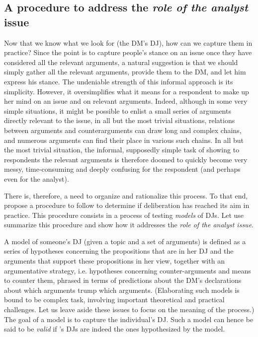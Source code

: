 \documentclass[version=3.21, pagesize, twoside=off, bibliography=totoc, DIV=calc, fontsize=12pt, a4paper, french, english]{scrartcl}
\begin{document}
\subsection{A procedure to address the \emph{role of the analyst} issue}
Now that we know what we look for (the \ac{DM}'s \ac{DJ}), how can we capture them in practice? Since the point is to capture people’s stance on an issue once they have considered all the relevant arguments, a natural suggestion is that we should simply gather all the relevant arguments, provide them to the \ac{DM}, and let him express his stance. The undeniable strength of this informal approach is its simplicity. However, it oversimplifies what it means for a respondent to make up her mind on an issue and on relevant arguments. Indeed, although in some very simple situations, it might be possible to enlist a small series of arguments directly relevant to the issue, in all but the most trivial situations, relations between arguments and counterarguments can draw long and complex chains, and numerous arguments can find their place in various such chains. In all but the most trivial situation, the informal, supposedly simple task of showing to respondents the relevant arguments is therefore doomed to quickly become very messy, time-consuming and deeply confusing for the respondent (and perhaps even for the analyst).

There is, therefore, a need to organize and rationalize this process. To that end,  propose a procedure to follow to determine if deliberation has reached its aim in practice. This procedure consists in a process of testing \emph{models} of \acp{DJ}. Let use summarize this procedure and show how it addresses the \emph{role of the analyst issue}.

A model of someone’s \ac{DJ} (given a topic and a set of arguments) is defined as a series of hypotheses concerning the propositions that are in her \ac{DJ} and the arguments that support these propositions in her view, together with an argumentative strategy, i.e. hypotheses concerning counter-arguments and means to counter them, phrased in terms of predictions about the \ac{DM}’s declarations about which arguments trump which arguments. (Elaborating such models is bound to be complex task, involving important theoretical and practical challenges. Let us leave aside these issues to focus on the meaning of the process.) The goal of a model is to capture the individual’s \ac{DJ}. Such a model can hence be said to be \emph{valid} if \thedm’s \acp{DJ} are indeed the ones hypothesized by the model.
\end{document}
